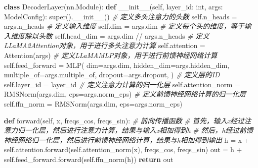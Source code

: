 \documentclass[
]{article}
\newenvironment{Shaded}{}{}
\newcommand{\BuiltInTok}[1]{\textcolor[rgb]{0.00,0.50,0.00}{#1}}
\newcommand{\CommentTok}[1]{\textcolor[rgb]{0.38,0.63,0.69}{\textit{#1}}}
\newcommand{\ControlFlowTok}[1]{\textcolor[rgb]{0.00,0.44,0.13}{\textbf{#1}}}
\newcommand{\FunctionTok}[1]{\textcolor[rgb]{0.02,0.16,0.49}{#1}}
\newcommand{\KeywordTok}[1]{\textcolor[rgb]{0.00,0.44,0.13}{\textbf{#1}}}
\newcommand{\NormalTok}[1]{#1}
\newcommand{\OperatorTok}[1]{\textcolor[rgb]{0.40,0.40,0.40}{#1}}
\newcommand{\VariableTok}[1]{\textcolor[rgb]{0.10,0.09,0.49}{#1}}
\begin{document}
\begin{Shaded}
\begin{Highlighting}[]
\KeywordTok{class}\NormalTok{ DecoderLayer(nn.Module):}
    \KeywordTok{def} \FunctionTok{\_\_init\_\_}\NormalTok{(}\VariableTok{self}\NormalTok{, layer\_id: }\BuiltInTok{int}\NormalTok{, args: ModelConfig):}
        \BuiltInTok{super}\NormalTok{().}\FunctionTok{\_\_init\_\_}\NormalTok{()}
        \CommentTok{\# 定义多头注意力的头数}
        \VariableTok{self}\NormalTok{.n\_heads }\OperatorTok{=}\NormalTok{ args.n\_heads}
        \CommentTok{\# 定义输入维度}
        \VariableTok{self}\NormalTok{.dim }\OperatorTok{=}\NormalTok{ args.dim}
        \CommentTok{\# 定义每个头的维度，等于输入维度除以头数}
        \VariableTok{self}\NormalTok{.head\_dim }\OperatorTok{=}\NormalTok{ args.dim }\OperatorTok{//}\NormalTok{ args.n\_heads}
        \CommentTok{\# 定义LLaMA2Attention对象，用于进行多头注意力计算}
        \VariableTok{self}\NormalTok{.attention }\OperatorTok{=}\NormalTok{ Attention(args)}
        \CommentTok{\# 定义LLaMAMLP对象，用于进行前馈神经网络计算}
        \VariableTok{self}\NormalTok{.feed\_forward }\OperatorTok{=}\NormalTok{ MLP(}
\NormalTok{            dim}\OperatorTok{=}\NormalTok{args.dim,}
\NormalTok{            hidden\_dim}\OperatorTok{=}\NormalTok{args.hidden\_dim,}
\NormalTok{            multiple\_of}\OperatorTok{=}\NormalTok{args.multiple\_of,}
\NormalTok{            dropout}\OperatorTok{=}\NormalTok{args.dropout,}
\NormalTok{        )}
        \CommentTok{\# 定义层的ID}
        \VariableTok{self}\NormalTok{.layer\_id }\OperatorTok{=}\NormalTok{ layer\_id}
        \CommentTok{\# 定义注意力计算的归一化层}
        \VariableTok{self}\NormalTok{.attention\_norm }\OperatorTok{=}\NormalTok{ RMSNorm(args.dim, eps}\OperatorTok{=}\NormalTok{args.norm\_eps)}
        \CommentTok{\# 定义前馈神经网络计算的归一化层}
        \VariableTok{self}\NormalTok{.ffn\_norm }\OperatorTok{=}\NormalTok{ RMSNorm(args.dim, eps}\OperatorTok{=}\NormalTok{args.norm\_eps)}

    \KeywordTok{def}\NormalTok{ forward(}\VariableTok{self}\NormalTok{, x, freqs\_cos, freqs\_sin):}
        \CommentTok{\# 前向传播函数}
        \CommentTok{\# 首先，输入x经过注意力归一化层，然后进行注意力计算，结果与输入x相加得到h}
        \CommentTok{\# 然后，h经过前馈神经网络归一化层，然后进行前馈神经网络计算，结果与h相加得到输出}
\NormalTok{        h }\OperatorTok{=}\NormalTok{ x }\OperatorTok{+} \VariableTok{self}\NormalTok{.attention.forward(}\VariableTok{self}\NormalTok{.attention\_norm(x), freqs\_cos, freqs\_sin)}
\NormalTok{        out }\OperatorTok{=}\NormalTok{ h }\OperatorTok{+} \VariableTok{self}\NormalTok{.feed\_forward.forward(}\VariableTok{self}\NormalTok{.ffn\_norm(h))}
        \ControlFlowTok{return}\NormalTok{ out}
\end{Highlighting}
\end{Shaded}
\end{document}

